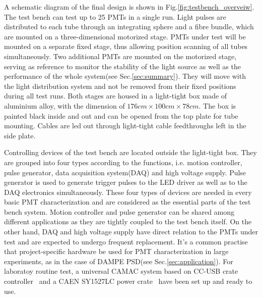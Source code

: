 \documentclass[5p, times]{elsarticle}
\begin{document}
A schematic diagram of the final design is shown in Fig.\ref{fig:testbench_overveiw}.
The test bench can test up to 25 PMTs in a single run.
Light pulses are distributed to each tube through an integrating sphere and a fibre bundle, which are mounted on a three-dimensional motorized stage.
PMTs under test will be mounted on a separate fixed stage, thus allowing position scanning of all tubes simultaneously.
Two additional PMTs are mounted on the motorized stage, serving as reference to monitor the stability of the light source as well as the performance of the whole system(see Sec.\ref{sec:summary}).
They will move with the light distribution system and not be removed from their fixed positions during all test runs. 
Both stages are housed in a light-tight box made of aluminium alloy, with the dimension of $176cm\times100cm\times78cm$.
The box is painted black inside and out and can be opened from the top plate for tube mounting.
Cables are led out through light-tight cable feedthroughs left in the side plate.

Controlling devices of the test bench are located outside the light-tight box.
They are grouped into four types according to the functions, i.e. motion controller, pulse generator, data acquisition system(DAQ) and high voltage supply.
Pulse generator is used to generate trigger pulses to the LED driver as well as to the DAQ electronics simultaneously.
These four types of devices are needed in every basic PMT characterization and are considered as the essential parts of the test bench system.
Motion controller and pulse generator can be shared among different applications as they are tightly coupled to the test bench itself.
On the other hand, DAQ and high voltage supply have direct relation to the PMTs under test and are expected to undergo frequent replacement.
It's a common practise that project-specific hardware be used for PMT characterization in large experiments, as in the case of DAMPE PSD(see Sec.\ref{sec:application}).
For laboratoy routine test, a universal CAMAC system based on CC-USB crate controller~\cite{cc_usb} and a CAEN SY1527LC power crate~\cite{sy1527lc} have been set up and ready to use.
\end{document}
